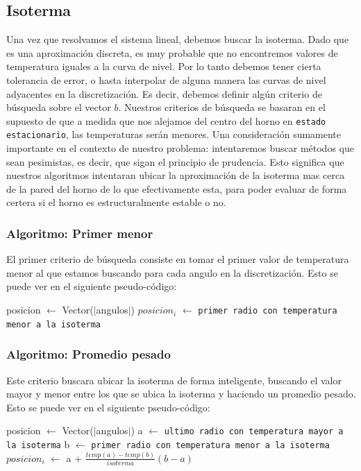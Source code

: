 \subsection{Isoterma}
Una vez que resolvamos el sistema lineal, debemos buscar la isoterma. Dado que es una aproximación discreta, es muy probable que no encontremos valores de temperatura iguales a la curva de nivel. Por lo tanto debemos tener cierta tolerancia de error, o hasta interpolar de alguna manera las curvas de nivel adyacentes en la discretización. Es decir, debemos definir algún criterio de búsqueda sobre el vector $b$. Nuestros criterios de búsqueda se basaran en el supuesto de que a medida que nos alejamos del centro del horno en \texttt{estado estacionario}, las temperaturas serán menores. Una consideración sumamente importante en el contexto de nuestro problema: intentaremos buscar métodos que sean pesimistas, es decir, que sigan el principio de prudencia. Esto significa que nuestros algoritmos intentaran ubicar la aproximación de la isoterma mas cerca de la pared del horno de lo que efectivamente esta, para poder evaluar de forma certera si el horno es estructuralmente estable o no.

\subsubsection{Algoritmo: Primer menor}

El primer criterio de búsqueda consiste en tomar el primer valor de temperatura menor al que estamos buscando para cada angulo en la discretización. Esto se puede ver en el siguiente pseudo-código:

\begin{algorithmic}
\State posicion $\gets$ Vector($\vert$angulos$\vert$)
    \State $posicion_i$ $\gets$ \texttt{primer radio con temperatura menor a la isoterma}
\EndFor
{}
\EndProcedure
\end{algorithmic}

\subsubsection{Algoritmo: Promedio pesado}

Este criterio buscara ubicar la isoterma de forma inteligente, buscando el valor mayor y menor entre los que se ubica la isoterma y haciendo un promedio pesado. Esto se puede ver en el siguiente pseudo-código:

\begin{algorithmic}
\State posicion $\gets$ Vector($\vert$angulos$\vert$)
    \State a $\gets$ \texttt{ultimo radio con temperatura mayor a la isoterma}
    \State b $\gets$ \texttt{primer radio con temperatura menor a la isoterma}
    \State $posicion_i$ $\gets$ a + $\frac{temp(a)-temp(b)}{isoterma}(b-a)$
\EndFor
{}
\EndProcedure
\end{algorithmic}


